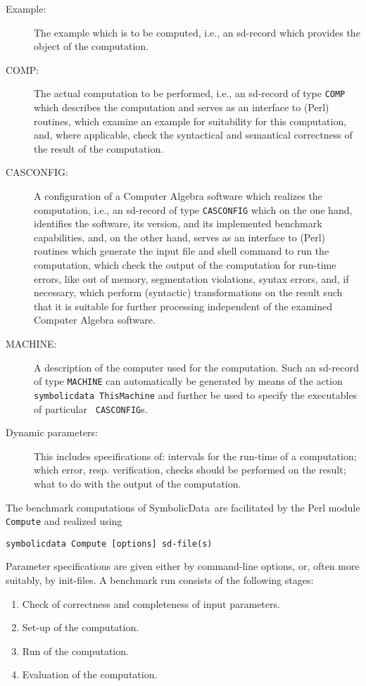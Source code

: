 \documentclass[11pt,a4paper]{article}
\newcommand{\SD}{{\sc Symbolic\-Data}}
\begin{document}
\begin{description}
\item[Example:] The example which is to be computed, i.e., an
sd-record which provides the object of the computation.
\item[COMP:] The actual computation to be performed, i.e., an
sd-record of type {\tt COMP} which describes the computation and
serves as an interface to (Perl) routines, which examine an example
for suitability for this computation, and, where applicable, check
the syntactical and semantical correctness of the result of the
computation.
\item[CASCONFIG:] A configuration of a Computer Algebra software which
realizes the computation, i.e., an sd-record of type {\tt CASCONFIG}
which on the one hand, identifies the software, its version, and its
implemented benchmark capabilities, and, on the other hand, serves as
an interface to (Perl) routines which generate the input file and
shell command to run the computation, which check the output of the
computation for run-time errors, like out of memory, segmentation
violations, syntax errors, and, if necessary, which perform
(syntactic) transformations on the result such that it is suitable for
further processing independent of the examined Computer Algebra
software.
\item[MACHINE:] A description of the computer used for the
computation. Such an sd-record of type {\tt MACHINE} can automatically
be generated by means of the action {\tt symbolicdata ThisMachine} and
further be used to specify the executables of particular {\tt
CASCONFIG}s.
\item[Dynamic parameters:] This includes specifications of: 
intervals for the run-time of a computation; which error, resp. verification,
checks should be performed on the result; what to do with the
output of the computation.
\end{description}

The benchmark computations of \SD\ are facilitated by the Perl module
{\tt Compute} and realized using
\begin{verbatim}
symbolicdata Compute [options] sd-file(s)
\end{verbatim}
Parameter specifications are given either by command-line options, or, 
often more suitably, by init-files. A benchmark run consists of the
following stages:
\begin{enumerate}
\item Check of correctness and completeness of input parameters.
\item Set-up of the computation.
\item Run of the computation.
\item Evaluation of the computation.
\end{enumerate}
\end{document}
